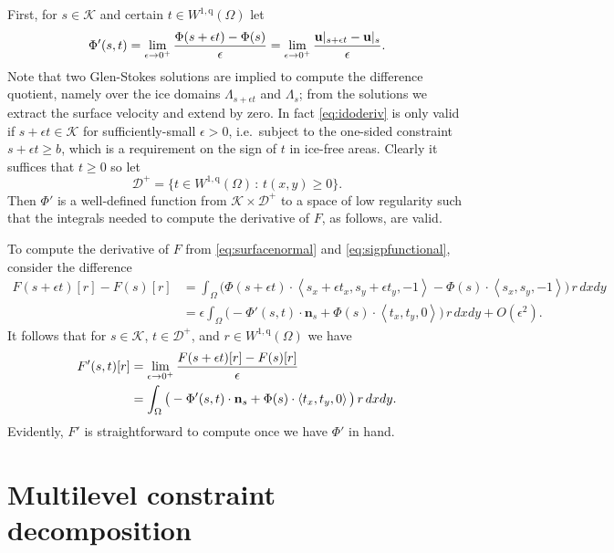 \documentclass[letterpaper,final,12pt,reqno]{amsart}
\theoremstyle{claim}
\newcommand{\eps}{\epsilon}
\newcommand{\bn}{\mathbf{n}}
\newcommand{\bu}{\mathbf{u}}
\newcommand{\qq}{{\text{q}}}
\numberwithin{equation}{section}
\numberwithin{figure}{section}
\numberwithin{table}{section}
\numberwithin{theorem}{section}
\begin{document}
First, for $s \in \mathcal{K}$ and certain $t \in W^{1,\qq}(\Omega)$ let
\begin{equation}
\Phi'(s,t) = \lim_{\eps\to 0^+} \frac{\Phi(s+\eps t) - \Phi(s)}{\eps} = \lim_{\eps\to 0^+} \frac{\bu|_{s+\eps t} - \bus}{\eps}. \label{eq:idoderiv}
\end{equation}
Note that two Glen-Stokes solutions are implied to compute the difference quotient, namely over the ice domains $\Lambda_{s+\eps t}$ and $\Lambda_s$; from the solutions we extract the surface velocity and extend by zero.  In fact \eqref{eq:idoderiv} is only valid if $s+\eps t \in \mathcal{K}$ for sufficiently-small $\eps>0$, i.e.~subject to the one-sided constraint $s+\eps t \ge b$, which is a requirement on the sign of $t$ in ice-free areas.  Clearly it suffices that $t \ge 0$ so let
\begin{equation}
\mathcal{D}^+ = \{t \in W^{1,\qq}(\Omega) \,:\, t(x,y) \ge 0\}. \label{eq:infdefectset}
\end{equation}
Then $\Phi'$ is a well-defined function from $\mathcal{K} \times \mathcal{D}^+$ to a space of low regularity such that the integrals needed to compute the derivative of $F$, as follows, are valid.

To compute the derivative of $F$ from \eqref{eq:surfacenormal} and \eqref{eq:sigpfunctional}, consider the difference
\begin{align*}
F(s+\eps t)[r] - F(s)[r] &= \int_\Omega \Big(\Phi(s+\eps t) \cdot \left<s_x+\eps t_x,s_y+\eps t_y,-1\right> - \Phi(s) \cdot \left<s_x,s_y,-1\right>\Big)\, r \,dx dy \\
    &= \eps \int_\Omega \big(-\Phi'(s,t) \cdot \bn_s + \Phi(s) \cdot \left<t_x,t_y,0\right>\big)\, r \,dx dy + O(\eps^2).
\end{align*}
It follows that for $s\in \mathcal{K}$, $t\in \mathcal{D}^+$, and $r \in W^{1,\qq}(\Omega)$ we have
\begin{align}
F'(s,t)[r] &= \lim_{\eps\to 0^+} \frac{F(s+\eps t)[r] - F(s)[r]}{\eps}  \label{eq:sigpfunctionalderiv} \\
    &= \int_\Omega \big(-\Phi'(s,t) \cdot \bn_s + \Phi(s) \cdot \left<t_x,t_y,0\right>\big)\, r \,dx dy. \notag
\end{align}
Evidently, $F'$ is straightforward to compute once we have $\Phi'$ in hand.

\section{Multilevel constraint decomposition} \label{sec:mcdstokes}
\end{document}

